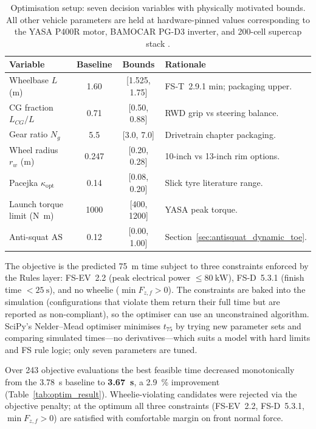 \begin{table}[H]
\centering
\caption{Optimisation setup: seven decision variables with physically
motivated bounds. All other vehicle parameters are held at
hardware-pinned values corresponding to the YASA P400R motor, BAMOCAR
PG-D3 inverter, and \num{200}-cell supercap stack
\cite{bamocar_pg, yasa_p400r}.}
\label{tab:optim_setup}
\footnotesize
\begin{tabular}{|l|c|c|l|}
\hline
\textbf{Variable} & \textbf{Baseline} & \textbf{Bounds} & \textbf{Rationale} \\
\hline
Wheelbase $L$ (\si{\metre})               & 1.60 & [1.525, 1.75] & FS-T~2.9.1 min; packaging upper. \\
CG fraction $L_{CG}/L$                    & 0.71 & [0.50, 0.88] & RWD grip vs steering balance. \\
Gear ratio $N_g$                          & 5.5 & [3.0, 7.0] & Drivetrain chapter packaging. \\
Wheel radius $r_w$ (\si{\metre})          & 0.247 & [0.20, 0.28] & 10-inch vs 13-inch rim options. \\
Pacejka $\kappa_\text{opt}$               & 0.14 & [0.08, 0.20] & Slick tyre literature range. \\
Launch torque limit (\si{\newton\metre})  & 1000 & [400, 1200] & YASA peak torque. \\
Anti-squat $\text{AS}$                    & 0.12 & [0.00, 1.00] & Section~\ref{sec:antisquat_dynamic_toe}. \\
\hline
\end{tabular}
\end{table}

The objective is the predicted \SI{75}{\metre} time subject to three
constraints enforced by the Rules layer: FS-EV~2.2 (peak electrical
power $\leq \SI{80}{\kilo\watt}$), FS-D~5.3.1 (finish time
$< \SI{25}{\second}$), and no wheelie
($\min F_{z,f} > 0$). The constraints are baked into the simulation
(configurations that violate them return their full time but are
reported as non-compliant), so the optimiser can use an unconstrained
algorithm. SciPy's Nelder--Mead optimiser \cite{press2007} minimises \(t_{75}\) by
trying new parameter sets and comparing simulated times---no
derivatives---which suits a model with hard limits and FS rule logic;
only seven parameters are tuned.

Over \num{243} objective evaluations the best feasible time decreased
monotonically from the \SI{3.78}{\second} baseline to
\textbf{\SI{3.67}{\second}}, a \SI{2.9}{\percent} improvement
(Table~\ref{tab:optim_result}). Wheelie-violating candidates were
rejected via the objective penalty; at the optimum all three
constraints (FS-EV~2.2, FS-D~5.3.1, $\min F_{z,f} > 0$) are
satisfied with comfortable margin on front normal force.

